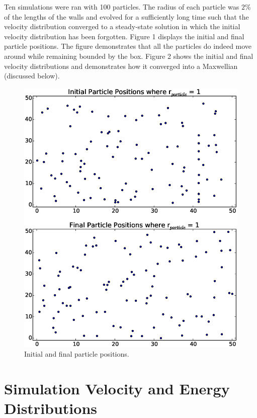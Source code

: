 \documentclass[12pt]{amsart}
\begin{document}
Ten simulations were ran with 100 particles.  The radius of each particle was $2 \%$ of the lengths of the walls and evolved for a sufficiently long time such that the velocity distribution converged to a steady-state solution in which the initial velocity distribution has been forgotten.  Figure 1 displays the initial and final particle positions.  The figure demonstrates that all the particles do indeed move around while remaining bounded by the box.  Figure 2 shows the initial and final velocity distributions and demonstrates how it converged into a Maxwellian (discussed below).
\begin{figure}[h!]
  \centering
    \includegraphics[width=1.0\textwidth]{pos_dist.eps}
    \caption{Initial and final particle positions.}
\end{figure}


\section{Simulation Velocity and Energy Distributions}
\end{document}
